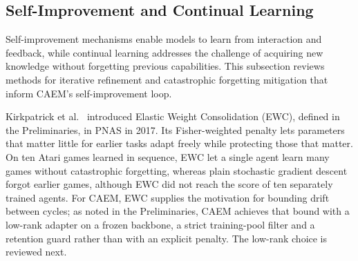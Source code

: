 \subsection{Self-Improvement and Continual Learning}
\label{sec:lit-self-improvement}

Self-improvement mechanisms enable models to learn from interaction and feedback, while continual learning addresses the challenge of acquiring new knowledge without forgetting previous capabilities. This subsection reviews methods for iterative refinement and catastrophic forgetting mitigation that inform CAEM's self-improvement loop.

Kirkpatrick et al.\ \cite{doi:10.1073/pnas.1611835114} introduced Elastic Weight Consolidation (EWC), defined in the Preliminaries, in PNAS in 2017. Its Fisher-weighted penalty lets parameters that matter little for earlier tasks adapt freely while protecting those that matter. On ten Atari games learned in sequence, EWC let a single agent learn many games without catastrophic forgetting, whereas plain stochastic gradient descent forgot earlier games, although EWC did not reach the score of ten separately trained agents. For CAEM, EWC supplies the motivation for bounding drift between cycles; as noted in the Preliminaries, CAEM achieves that bound with a low-rank adapter on a frozen backbone, a strict training-pool filter and a retention guard rather than with an explicit penalty. The low-rank choice is reviewed next.

